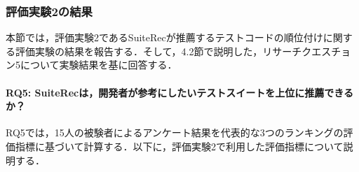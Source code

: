 \documentclass[12pt]{jarticle} %
\begin{document}
\subsubsection{評価実験2の結果}

本節では，評価実験2である{\sf SuiteRec}が推薦するテストコードの順位付けに関する評価実験の結果を報告する．そして，4.2節で説明した，リサーチクエスチョン5について実験結果を基に回答する．

\paragraph{RQ5: SuiteRecは，開発者が参考にしたいテストスイートを上位に推薦できるか？}
RQ5では，15人の被験者によるアンケート結果を代表的な3つのランキングの評価指標に基づいて計算する．以下に，評価実験2で利用した評価指標について説明する．
\end{document}
